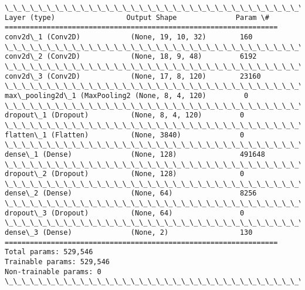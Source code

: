 \documentclass[11pt]{article}
\begin{document}
    \begin{Verbatim}[commandchars=\\\{\}]
\_\_\_\_\_\_\_\_\_\_\_\_\_\_\_\_\_\_\_\_\_\_\_\_\_\_\_\_\_\_\_\_\_\_\_\_\_\_\_\_\_\_\_\_\_\_\_\_\_\_\_\_\_\_\_\_\_\_\_\_\_\_\_\_\_
Layer (type)                 Output Shape              Param \#   
=================================================================
conv2d\_1 (Conv2D)            (None, 19, 10, 32)        160       
\_\_\_\_\_\_\_\_\_\_\_\_\_\_\_\_\_\_\_\_\_\_\_\_\_\_\_\_\_\_\_\_\_\_\_\_\_\_\_\_\_\_\_\_\_\_\_\_\_\_\_\_\_\_\_\_\_\_\_\_\_\_\_\_\_
conv2d\_2 (Conv2D)            (None, 18, 9, 48)         6192      
\_\_\_\_\_\_\_\_\_\_\_\_\_\_\_\_\_\_\_\_\_\_\_\_\_\_\_\_\_\_\_\_\_\_\_\_\_\_\_\_\_\_\_\_\_\_\_\_\_\_\_\_\_\_\_\_\_\_\_\_\_\_\_\_\_
conv2d\_3 (Conv2D)            (None, 17, 8, 120)        23160     
\_\_\_\_\_\_\_\_\_\_\_\_\_\_\_\_\_\_\_\_\_\_\_\_\_\_\_\_\_\_\_\_\_\_\_\_\_\_\_\_\_\_\_\_\_\_\_\_\_\_\_\_\_\_\_\_\_\_\_\_\_\_\_\_\_
max\_pooling2d\_1 (MaxPooling2 (None, 8, 4, 120)         0         
\_\_\_\_\_\_\_\_\_\_\_\_\_\_\_\_\_\_\_\_\_\_\_\_\_\_\_\_\_\_\_\_\_\_\_\_\_\_\_\_\_\_\_\_\_\_\_\_\_\_\_\_\_\_\_\_\_\_\_\_\_\_\_\_\_
dropout\_1 (Dropout)          (None, 8, 4, 120)         0         
\_\_\_\_\_\_\_\_\_\_\_\_\_\_\_\_\_\_\_\_\_\_\_\_\_\_\_\_\_\_\_\_\_\_\_\_\_\_\_\_\_\_\_\_\_\_\_\_\_\_\_\_\_\_\_\_\_\_\_\_\_\_\_\_\_
flatten\_1 (Flatten)          (None, 3840)              0         
\_\_\_\_\_\_\_\_\_\_\_\_\_\_\_\_\_\_\_\_\_\_\_\_\_\_\_\_\_\_\_\_\_\_\_\_\_\_\_\_\_\_\_\_\_\_\_\_\_\_\_\_\_\_\_\_\_\_\_\_\_\_\_\_\_
dense\_1 (Dense)              (None, 128)               491648    
\_\_\_\_\_\_\_\_\_\_\_\_\_\_\_\_\_\_\_\_\_\_\_\_\_\_\_\_\_\_\_\_\_\_\_\_\_\_\_\_\_\_\_\_\_\_\_\_\_\_\_\_\_\_\_\_\_\_\_\_\_\_\_\_\_
dropout\_2 (Dropout)          (None, 128)               0         
\_\_\_\_\_\_\_\_\_\_\_\_\_\_\_\_\_\_\_\_\_\_\_\_\_\_\_\_\_\_\_\_\_\_\_\_\_\_\_\_\_\_\_\_\_\_\_\_\_\_\_\_\_\_\_\_\_\_\_\_\_\_\_\_\_
dense\_2 (Dense)              (None, 64)                8256      
\_\_\_\_\_\_\_\_\_\_\_\_\_\_\_\_\_\_\_\_\_\_\_\_\_\_\_\_\_\_\_\_\_\_\_\_\_\_\_\_\_\_\_\_\_\_\_\_\_\_\_\_\_\_\_\_\_\_\_\_\_\_\_\_\_
dropout\_3 (Dropout)          (None, 64)                0         
\_\_\_\_\_\_\_\_\_\_\_\_\_\_\_\_\_\_\_\_\_\_\_\_\_\_\_\_\_\_\_\_\_\_\_\_\_\_\_\_\_\_\_\_\_\_\_\_\_\_\_\_\_\_\_\_\_\_\_\_\_\_\_\_\_
dense\_3 (Dense)              (None, 2)                 130       
=================================================================
Total params: 529,546
Trainable params: 529,546
Non-trainable params: 0
\_\_\_\_\_\_\_\_\_\_\_\_\_\_\_\_\_\_\_\_\_\_\_\_\_\_\_\_\_\_\_\_\_\_\_\_\_\_\_\_\_\_\_\_\_\_\_\_\_\_\_\_\_\_\_\_\_\_\_\_\_\_\_\_\_

    \end{Verbatim}
\end{document}

